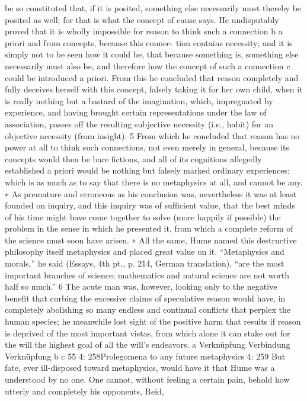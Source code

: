 be so constituted that, if it is posited, something else necessarily must
thereby be posited as well; for that is what the concept of cause says.
He undisputably proved that it is wholly impossible for reason to think
such a connection b a priori and from concepts, because this connec-
tion contains necessity; and it is simply not to be seen how it could be,
that because something is, something else necessarily must also be, and
therefore how the concept of such a connection c could be introduced a
priori. From this he concluded that reason completely and fully deceives
herself with this concept, falsely taking it for her own child, when it is
really nothing but a bastard of the imagination, which, impregnated by
experience, and having brought certain representations under the law of
association, passes off the resulting subjective necessity (i.e., habit) for
an objective necessity (from insight). 5 From which he concluded that
reason has no power at all to think such connections, not even merely
in general, because its concepts would then be bare ﬁctions, and all of
its cognitions allegedly established a priori would be nothing but falsely
marked ordinary experiences; which is as much as to say that there is no
metaphysics at all, and cannot be any. ∗
As premature and erroneous as his conclusion was, nevertheless it was
at least founded on inquiry, and this inquiry was of sufﬁcient value, that
the best minds of his time might have come together to solve (more
happily if possible) the problem in the sense in which he presented it,
from which a complete reform of the science must soon have arisen.
∗ All the same, Hume named this destructive philosophy itself metaphysics and
placed great value on it. “Metaphysics and morals,” he said (Essays, 4th pt.,
p. 214, German translation), “are the most important branches of science;
mathematics and natural science are not worth half so much.” 6 The acute man
was, however, looking only to the negative beneﬁt that curbing the excessive
claims of speculative reason would have, in completely abolishing so many
endless and continual conﬂicts that perplex the human species; he meanwhile
lost sight of the positive harm that results if reason is deprived of the most
important vistas, from which alone it can stake out for the will the highest goal
of all the will’s endeavors.
a Verknüpfung
Verbindung
Verknüpfung
b
c
55
4: 258Prolegomena to any future metaphysics
4: 259
But fate, ever ill-disposed toward metaphysics, would have it that
Hume was a understood by no one. One cannot, without feeling a
certain pain, behold how utterly and completely his opponents, Reid,
